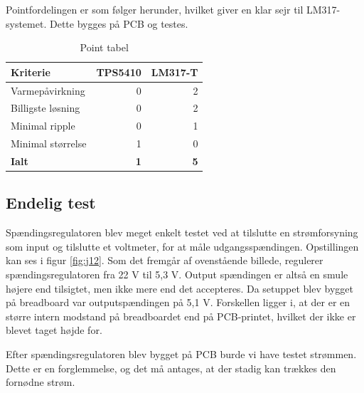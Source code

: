 Pointfordelingen er som følger herunder, hvilket giver en klar sejr til LM317-systemet. Dette bygges på PCB og testes.
\begin{table}[h]
  \centering
\begin{tabular}{lrr}
\textbf{Kriterie} & \textbf{TPS5410} & \textbf{LM317-T} \\
\hline
Varmepåvirkning & 0 & 2 \\
Billigste løsning & 0 & 2 \\
Minimal ripple & 0 & 1 \\
Minimal størrelse & 1 & 0 \\
\hline
\textbf{Ialt} & \textbf{1} & \textbf{5} \\
\end{tabular}
  \caption{Point tabel}
  \label{tab:pointj}
\end{table}

\subsection{Endelig test}
\label{sec:endelig-test}

Spændingsregulatoren blev meget enkelt testet ved at tilslutte en strømforsyning som input og tilslutte et voltmeter, for at måle udgangsspændingen. Opstillingen kan ses i figur \ref{fig:j12}. Som det fremgår af ovenstående billede, regulerer spændingsregulatoren fra 22 V til 5,3 V. Output spændingen er altså en smule højere end tilsigtet, men ikke mere end det accepteres. Da setuppet blev bygget på breadboard var outputspændingen på 5,1 V. Forskellen ligger i, at der er en større intern modstand på breadboardet end på PCB-printet, hvilket der ikke er blevet taget højde for. 

Efter spændingsregulatoren blev bygget på PCB burde vi have testet strømmen. Dette er en forglemmelse, og det må antages, at der stadig kan trækkes den fornødne strøm. 

